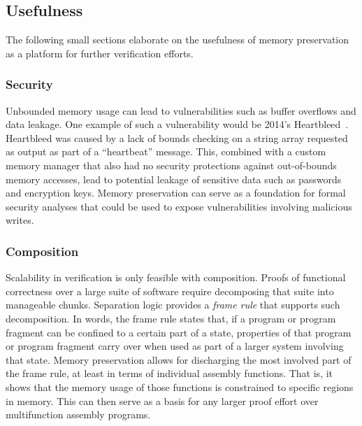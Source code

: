 \subsection{Usefulness}
The following small sections elaborate on the usefulness of memory preservation
as a platform for further verification efforts.

\subsubsection{Security}
Unbounded memory usage can lead to vulnerabilities
such as buffer overflows and data leakage.
One example of such a vulnerability would be 2014's Heartbleed~\citep{heartbleed}.
Heartbleed was caused by a lack of bounds checking on a string array
requested as output as part of a ``heartbeat'' message.
This, combined with a custom memory manager
that also had no security protections against out-of-bounds memory accesses,
lead to potential leakage of sensitive data such as passwords and encryption keys.
Memory preservation can serve as a foundation for formal security analyses
that could be used to expose vulnerabilities involving malicious writes.

\subsubsection{Composition}
Scalability in verification is only feasible with composition.
Proofs of functional correctness over a large suite of software
require decomposing that suite into manageable chunks.
Separation logic provides a \emph{frame rule} that supports such decomposition\cite{reynolds2002separation}.
In words, the frame rule states that,
if a program or program fragment can be confined to a certain part of a state,
properties of that program or program fragment carry over
when used as part of a larger system involving that state.
Memory preservation allows for discharging the most involved part of the frame rule,
at least in terms of individual assembly functions.
That is, it shows that the memory usage of those functions is constrained
to specific regions in memory.
This can then serve as a basis
for any larger proof effort over multifunction assembly programs.

